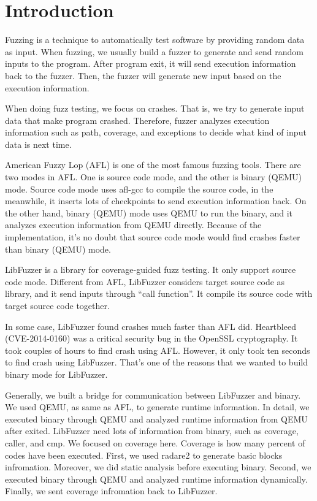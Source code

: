 
\section{Introduction}
\label{sec:intro}

  Fuzzing is a technique to automatically test software by providing random data as input. When fuzzing, we usually build a fuzzer to generate and send random inputs to the program. After program exit, it will send execution information back to the fuzzer. Then, the fuzzer will generate new input based on the execution information.

  When doing fuzz testing, we focus on crashes. That is, we try to generate input data that make program crashed. Therefore, fuzzer analyzes execution information such as path, coverage, and exceptions to decide what kind of input data is next time.

  American Fuzzy Lop (AFL) is one of the most famous fuzzing tools. There are two modes in AFL. One is source code mode, and the other is binary (QEMU) mode. Source code mode uses afl-gcc to compile the source code, in the meanwhile, it inserts lots of checkpoints to send execution information back. On the other hand, binary (QEMU) mode uses QEMU to run the binary, and it analyzes execution information from QEMU directly. Because of the implementation, it’s no doubt that source code mode would find crashes faster than binary (QEMU) mode.

  LibFuzzer is a library for coverage-guided fuzz testing. It only support source code mode. Different from AFL, LibFuzzer considers target source code as library, and it send inputs through “call function”. It compile its source code with target source code together.

  In some case, LibFuzzer found crashes much faster than AFL did. Heartbleed (CVE-2014-0160) was a critical security bug in the OpenSSL cryptography. It took couples of hours to find crash using AFL. However, it only took ten seconds to find crash using LibFuzzer. That’s one of the reasons that we wanted to build binary mode for LibFuzzer.

  Generally, we built a bridge for communication between LibFuzzer and binary. We used QEMU, as same as AFL, to generate runtime information. In detail, we executed binary through QEMU and analyzed runtime information from QEMU after exited. LibFuzzer need lots of information from binary, such as coverage, caller, and cmp. We focused on coverage here. Coverage is how many percent of codes have been executed. First, we used radare2 to generate basic blocks infromation. Moreover, we did static analysis before executing binary. Second, we executed binary through QEMU and analyzed runtime information dynamically. Finally, we sent coverage infromation back to LibFuzzer.
